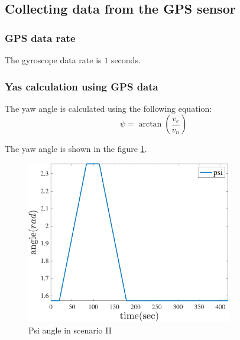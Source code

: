 \subsection{Collecting data from the GPS sensor}
\subsubsection{GPS data rate}
The gyroscope data rate is $1$ seconds.

\subsubsection{Yas calculation using GPS data}
The yaw angle is calculated using the following equation:
\begin{equation}
  \psi = \arctan{\left(\dfrac{v_e}{v_n}\right)}
\end{equation}

The yaw angle is shown in the figure \ref{fig:psi_angle_gps}.
\begin{figure}[H]
  \centering
  \includegraphics[width=0.8\textwidth]{../Figure/Q1/psi_3}
  \caption{Psi angle in scenario II}
  \label{fig:psi_angle_gps}
\end{figure}

